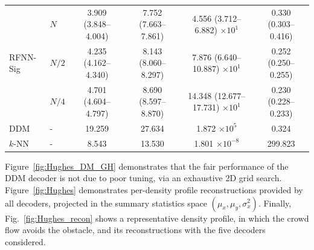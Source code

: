 \documentclass{article}
\begin{document}
\begin{table}[htbp]
{\begin{tabular}{@{}llcccc@{}}
\multirow{3}{*}{RFNN-Sig} 
&	$N$	     & 3.909 (3.848--4.004) & 7.752 (7.663--7.861) & 4.556 (3.712--6.882) $\times 10^1$ & 0.330 (0.303--0.416) \\
&	$N/2$	 & 4.235 (4.162--4.340) & 8.143 (8.060--8.297) & 7.876 (6.640--10.887) $\times 10^1$ & 0.252 (0.250--0.255) \\
&	$N/4$	 & 4.701 (4.604--4.797) & 8.690 (8.597--8.870) & 14.348 (12.677--17.731) $\times 10^1$ & 0.230 (0.228--0.233) \\
\midrule

DDM  &	-	& 19.259 & 27.634 & 1.872 $\times 10^{5}$  & 0.324   \\
$k$-NN &	-	& 8.543  & 13.530 & 1.801 $\times 10^{-8}$ & 299.823 \\

\bottomrule
\end{tabular}%
}
\end{table}

Figure~\ref{fig:Hughes_DM_GH} demonstrates that the fair performance of the DDM decoder is not due to poor tuning, via an exhaustive 2D grid search. Figure~\ref{fig:Hughes} demonstrates per-density profile reconstructions provided by all decoders, projected in the summary statistics space $(\mu_x,\mu_y,\sigma^2_x)$. Finally, Fig.~\ref{fig:Hughes_recon} shows a representative density profile, in which the crowd flow avoids the obstacle,  and its reconstructions with the five decoders considered.
\end{document}
